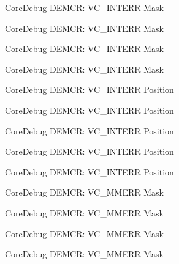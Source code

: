 \begin{DoxyRefList}
\label{deprecated__deprecated000202}%
%
Core\+Debug D\+E\+M\+CR\+: V\+C\+\_\+\+I\+N\+T\+E\+RR Mask 

\label{deprecated__deprecated000344}%
%
Core\+Debug D\+E\+M\+CR\+: V\+C\+\_\+\+I\+N\+T\+E\+RR Mask 

\label{deprecated__deprecated000420}%
%
Core\+Debug D\+E\+M\+CR\+: V\+C\+\_\+\+I\+N\+T\+E\+RR Mask 

\label{deprecated__deprecated000509}%
%
Core\+Debug D\+E\+M\+CR\+: V\+C\+\_\+\+I\+N\+T\+E\+RR Mask  
\item[Member \mbox{\hyperlink{group__CMSIS__CoreDebug_ga22079a6e436f23b90308be97e19cf07e}{Core\+Debug\+\_\+\+D\+E\+M\+C\+R\+\_\+\+V\+C\+\_\+\+I\+N\+T\+E\+R\+R\+\_\+\+Pos}} ]\label{deprecated__deprecated000057}%
%
Core\+Debug D\+E\+M\+CR\+: V\+C\+\_\+\+I\+N\+T\+E\+RR Position 

\label{deprecated__deprecated000201}%
%
Core\+Debug D\+E\+M\+CR\+: V\+C\+\_\+\+I\+N\+T\+E\+RR Position 

\label{deprecated__deprecated000343}%
%
Core\+Debug D\+E\+M\+CR\+: V\+C\+\_\+\+I\+N\+T\+E\+RR Position 

\label{deprecated__deprecated000419}%
%
Core\+Debug D\+E\+M\+CR\+: V\+C\+\_\+\+I\+N\+T\+E\+RR Position 

\label{deprecated__deprecated000508}%
%
Core\+Debug D\+E\+M\+CR\+: V\+C\+\_\+\+I\+N\+T\+E\+RR Position  
\item[Member \mbox{\hyperlink{group__CMSIS__CoreDebug_gad420a9b60620584faaca6289e83d3a87}{Core\+Debug\+\_\+\+D\+E\+M\+C\+R\+\_\+\+V\+C\+\_\+\+M\+M\+E\+R\+R\+\_\+\+Msk}} ]\label{deprecated__deprecated000068}%
%
Core\+Debug D\+E\+M\+CR\+: V\+C\+\_\+\+M\+M\+E\+RR Mask 

\label{deprecated__deprecated000212}%
%
Core\+Debug D\+E\+M\+CR\+: V\+C\+\_\+\+M\+M\+E\+RR Mask 

\label{deprecated__deprecated000354}%
%
Core\+Debug D\+E\+M\+CR\+: V\+C\+\_\+\+M\+M\+E\+RR Mask 

\label{deprecated__deprecated000430}%
%
Core\+Debug D\+E\+M\+CR\+: V\+C\+\_\+\+M\+M\+E\+RR Mask 


\end{DoxyRefList}
